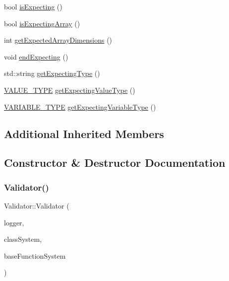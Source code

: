 \begin{DoxyCompactItemize}
\item 
bool \hyperlink{classValidator_ab94d9925c577be6a8cad24a5a6b60db9}{is\+Expecting} ()
\item 
bool \hyperlink{classValidator_a4452dfbd72b35d4cd4053e7efbc24f24}{is\+Expecting\+Array} ()
\item 
int \hyperlink{classValidator_aa5a6e2e97ba4766e7c723e4c2154644e}{get\+Expected\+Array\+Dimensions} ()
\item 
void \hyperlink{classValidator_adfa1b750001981ae5daa085d32bd626f}{end\+Expecting} ()
\item 
std\+::string \hyperlink{classValidator_a7d5578b26227de6b470eb1da779c33a8}{get\+Expecting\+Type} ()
\item 
\hyperlink{statics_8h_a0674a913b8e8c8a9f265baab3646b565}{V\+A\+L\+U\+E\+\_\+\+T\+Y\+PE} \hyperlink{classValidator_a8f4dadf89fe1ab60e0883bdcb97fd508}{get\+Expecting\+Value\+Type} ()
\item 
\hyperlink{statics_8h_a4c85b3a98d55cc0252806c950379cce0}{V\+A\+R\+I\+A\+B\+L\+E\+\_\+\+T\+Y\+PE} \hyperlink{classValidator_a18f11aa871d35f7de943afe80935b660}{get\+Expecting\+Variable\+Type} ()
\end{DoxyCompactItemize}
\subsection*{Additional Inherited Members}


\subsection{Constructor \& Destructor Documentation}
\mbox{\label{classValidator_ae4550667c2bc1d85f4654cf6f5efe253}} 
\subsubsection{\texorpdfstring{Validator()}{Validator()}}
{\footnotesize\ttfamily Validator\+::\+Validator (\begin{DoxyParamCaption}\item[{\hyperlink{classLogger}{Logger} $\ast$}]{logger,  }\item[{\hyperlink{classClassSystem}{Class\+System} $\ast$}]{class\+System,  }\item[{\hyperlink{classFunctionSystem}{Function\+System} $\ast$}]{base\+Function\+System }\end{DoxyParamCaption})}


